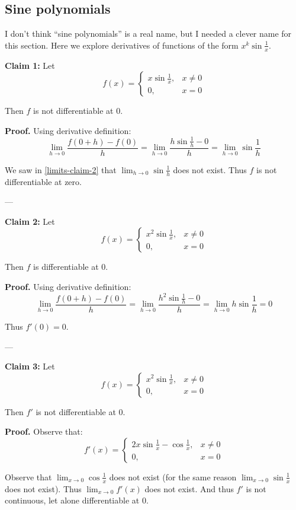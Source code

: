 \subsection{Sine polynomials}

I don't think ``sine polynomials'' is a real name, but I needed a
clever name for this section. Here we explore derivatives of functions
of the form $x^k\sin \frac{1}{x}$.

\vs

\textbf{Claim 1:} Let
\[f(x)=\begin{cases}
  x\sin \frac{1}{x},&x\neq0\\
  0,&x=0
\end{cases}\]

Then $f$ is not differentiable at $0$.

\vs

\textbf{Proof.} Using derivative definition:
\[\lim_{h\to0}\frac{f(0+h)-f(0)}{h}=\lim_{h\to0}\frac{h\sin
    \frac{1}{h}-0}{h}=\lim_{h\to0}\sin \frac{1}{h}\]

We saw in \ref{limits-claim-2} that $\lim_{h\to0}\sin \frac{1}{h}$ does
not exist. Thus $f$ is not differentiable at zero.

\vs---\vs

\textbf{Claim 2:} Let
\[f(x)=\begin{cases}
  x^2\sin \frac{1}{x},&x\neq0\\
  0,&x=0
\end{cases}\]

Then $f$ is differentiable at $0$.

\vs

\textbf{Proof.} Using derivative definition:
\[\lim_{h\to0}\frac{f(0+h)-f(0)}{h}=\lim_{h\to0}\frac{h^2\sin
    \frac{1}{h}-0}{h}=\lim_{h\to0}h\sin \frac{1}{h}=0\]

Thus $f'(0)=0$.

\vs---\vs

\textbf{Claim 3:} Let
\[f(x)=\begin{cases}
  x^2\sin \frac{1}{x},&x\neq0\\
  0,&x=0
\end{cases}\]

Then $f'$ is not differentiable at $0$.

\vs

\textbf{Proof.} Observe that:
\[f'(x)=\begin{cases}
  2x\sin \frac{1}{x}-\cos \frac{1}{x},&x\neq0\\
  0,&x=0
\end{cases}\]

Observe that $\lim_{x\to0}\cos \frac{1}{x}$ does not exist (for the same
reason $\lim_{x\to0}\sin \frac{1}{x}$ does not exist). Thus
$\lim_{x\to0}f'(x)$ does not exist. And thus $f'$ is not continuous, let
alone differentiable at $0$.

